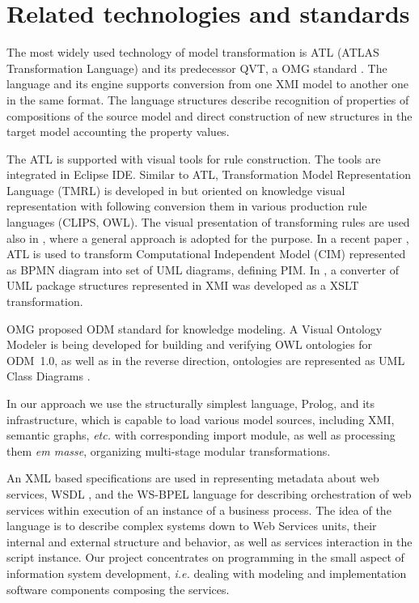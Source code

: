 \documentclass[runningheads]{llncs}
\begin{document}
\section{Related technologies and standards}
\label{sec:rel}

The most widely used technology of model transformation is ATL (ATLAS Transformation Language) \cite{atl} and its predecessor QVT, a OMG standard \cite{QVT}.  The language and its engine supports conversion from one XMI model to another one in the same format.  The language structures describe recognition of properties of compositions of the source model and direct construction of new structures in the target model accounting the property values.

The ATL is supported with visual tools for rule construction.  The tools are integrated in Eclipse IDE.  Similar to ATL, Transformation Model Representation Language (TMRL) is developed in \cite{nikita} but oriented on knowledge visual representation with following conversion them in various production rule languages (CLIPS, OWL).  The visual presentation of transforming rules are used also in \cite{GT}, where a general approach is adopted for the purpose.  In a recent paper \cite{azis}, ATL is used to transform Computational Independent Model (CIM) represented as BPMN diagram into set of UML diagrams, defining PIM.  In \cite{uml2owl}, a converter of UML package structures represented in XMI was developed as a XSLT transformation.

OMG proposed ODM standard \cite{odmprof} for knowledge modeling.  A Visual Ontology Modeler \cite{odnext} is being developed for building and verifying OWL ontologies for ODM~1.0, as well as in the reverse direction, ontologies are represented as UML Class Diagrams \cite{odmvis}.

In our approach we use the structurally simplest language, Prolog, and its infrastructure, which is capable to load various model sources, including XMI, semantic graphs, \emph{etc.} with corresponding import module, as well as processing them \emph{em masse}, organizing multi-stage modular transformations.

An XML based specifications are used in representing metadata about web services, WSDL \cite{wsdl}, and the WS-BPEL language \cite{wsbpel} for describing orchestration of web services within execution of an instance of a business process.  The idea of the language is to describe complex systems down to Web Services units, their internal and external structure and behavior, as well as services interaction in the script instance.  Our project concentrates on programming in the small aspect of information system development, \emph{i.e.} dealing with modeling and implementation software components composing the services.
\end{document}
